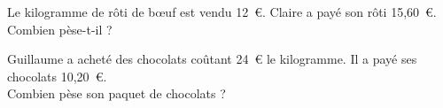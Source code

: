 \begin{myenumerate}
  \item Le kilogramme de rôti de b\oe uf est vendu 12~\textgreek{\euro}. Claire a payé son rôti 15,60~\textgreek{\euro}.\\Combien pèse-t-il ?
  \item Guillaume a acheté des chocolats coûtant 24~\textgreek{\euro} le kilogramme. Il a payé ses chocolats 10,20~\textgreek{\euro}.\\Combien pèse son paquet de chocolats ?
\end{myenumerate}